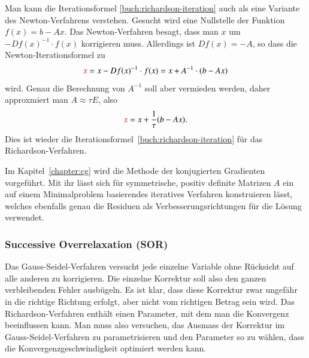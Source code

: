 Man kann die Iterationsformel \eqref{buch:richardson-iteration}
auch als eine Variante des Newton-Verfahrens verstehen.
Gesucht wird eine Nullstelle der Funktion $f(x) = b-Ax$.
Das Newton-Verfahren besagt, dass man $x$ um $-Df(x)^{-1}\cdot f(x)$
korrigieren muss.
%
Allerdings ist $Df(x) = -A$, so dass die Newton-Iterationsformel zu
\[
{\color{red}x}
=
x-
Df(x)^{-1} \cdot f(x)
=
x
+A^{-1}\cdot(b-Ax)
\]
wird.
Genau die Berechnung von $A^{-1}$ soll aber vermieden werden, daher
approxmiert man $A\approx \tau E$, also
\[
{\color{red}x}
=
x
+
\frac{1}{\tau}(b-Ax).
\]
Dies ist wieder die Iterationsformel~\eqref{buch:richardson-iteration}
für das Richardson-Verfahren.
%

Im Kapitel~\ref{chapter:cg} wird die Methode der konjugierten Gradienten
vorgeführt.
%
Mit ihr lässt sich für symmetrische,
%
positiv definite Matrizen $A$ ein auf einem Minimalproblem basierendes
%
%
iteratives Verfahren konstruieren lässt, welches ebenfalls genau
die Residuen als Verbesserungsrichtungen für die Lösung verwendet.

\subsubsection{Successive Overrelaxation (SOR)}
%
%
Das Gauss-Seidel-Verfahren versucht jede einzelne Variable
ohne Rücksicht auf alle anderen zu korrigieren.
%
Die einzelne Korrektur soll also den ganzen verbleibenden Fehler
ausbügeln.
Es ist klar, dass diese Korrektur zwar ungefähr in die richtige
Richtung erfolgt, aber nicht vom richtigen Betrag sein wird.
Das Richardson-Verfahren enthält einen Parameter, mit dem man die Konvergenz
beeinflussen kann.
%
Man muss also versuchen, das Ausmass der Korrektur im Gauss-Seidel-Verfahren
zu parametrisieren und den Parameter so zu wählen, dass die
Konvergenzgeschwindigkeit optimiert werden kann.

